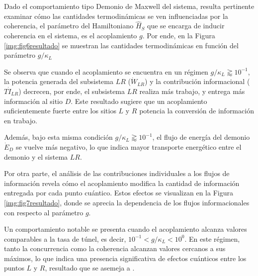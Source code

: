 Dado el comportamiento tipo Demonio de Maxwell del sistema, resulta pertinente examinar cómo las cantidades termodinámicas se ven influenciadas por la coherencia, el parámetro del Hamiltoniano $\hat{H}_{S}$ que se encarga de inducir coherencia en el sistema, es el acoplamiento \( g \). Por ende, en la Figura \ref{img:fig6resultado} se muestran las cantidades termodinámicas en función del parámetro \( g/\kappa_{L} \) 


Se observa que cuando el acoplamiento se encuentra en un régimen \( g/\kappa_{L} \gtrapprox 10^{-1}\), la potencia generada del subsistema $LR$ ($\dot{W}_{LR}$) y la contribución informacional ($T\dot{I}_{LR}$) decrecen, por ende, el subsistema $LR$ realiza más trabajo, y entrega más información al sitio $D$. Este resultado sugiere que un acoplamiento suficientemente fuerte entre los sitios $L$ y $R$ potencia la conversión de información en trabajo. 

Además, bajo esta misma condición \( g/\kappa_{L} \gtrapprox 10^{-1} \), el flujo de energía del demonio \( \dot{E}_{D} \) se vuelve más negativo, lo que indica mayor transporte energético entre el demonio y el sistema $LR$.

Por otra parte, el análisis de las contribuciones individuales a los flujos de información revela cómo el acoplamiento modifica la cantidad de información entregada por cada punto cuántico. Estos efectos se visualizan en la Figura \ref{img:fig7resultado}, donde se aprecia la dependencia de los flujos informacionales con respecto al parámetro \( g \).


Un comportamiento notable se presenta cuando el acoplamiento alcanza valores comparables a la tasa de túnel, es decir, \( 10^{-1}< g/\kappa_{L}< 10^{0} \). En este régimen, tanto la concurrencia como la coherencia alcanzan valores cercanos a sus máximos, lo que indica una presencia significativa de efectos cuánticos entre los puntos \( L \) y \( R \), resultado que se asemeja a \cite{prech2023entanglement}. 

